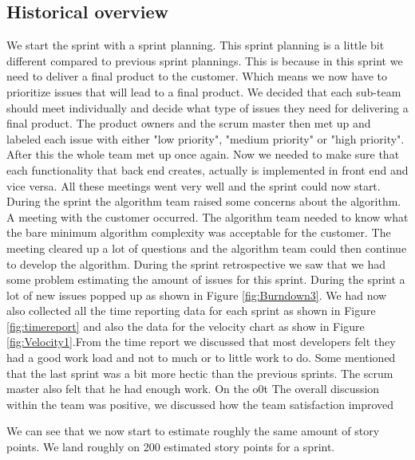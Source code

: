 \documentclass{article}
\begin{document}
\subsection{Historical overview}
We start the sprint with a sprint planning. This sprint planning is a little bit different compared to previous sprint plannings. This is because in this sprint we need to deliver a final product to the customer. Which means we now have to prioritize issues that will lead to a final product. We decided that each sub-team should meet individually and decide what type of issues they need for delivering a final product. The product owners and the scrum master then met up and labeled each issue with either "low priority", "medium priority"  or "high priority". After this the whole team met up once again. Now we needed to make sure that each functionality that back end creates, actually is implemented in front end and vice versa. All these meetings went very well and the sprint could now start. During the sprint the algorithm team raised some concerns about the algorithm. A meeting with the customer occurred. The algorithm team needed to know what the bare minimum algorithm complexity was acceptable for the customer. The meeting cleared up a lot of questions and the algorithm team could then continue to develop the algorithm. %
During the sprint retrospective we saw that we had some problem estimating the amount of issues for this sprint. During the sprint a lot of new issues popped up as shown in Figure \ref{fig:Burndown3}. We had now also collected all the time reporting data for each sprint as shown in Figure \ref{fig:timereport} and also the data for the velocity chart as show in Figure \ref{fig:Velocity1}.From the time report we discussed that most developers felt they had a good work load and not to much or to little work to do. Some mentioned that the last sprint was a bit more hectic than the previous sprints. The scrum master also felt that he had enough work. On the o0t The overall discussion within the team was positive, we discussed how the team satisfaction improved 

We can see that we now start to estimate roughly the same amount of story points. We land roughly on 200 estimated story points for a sprint. 
\end{document}
